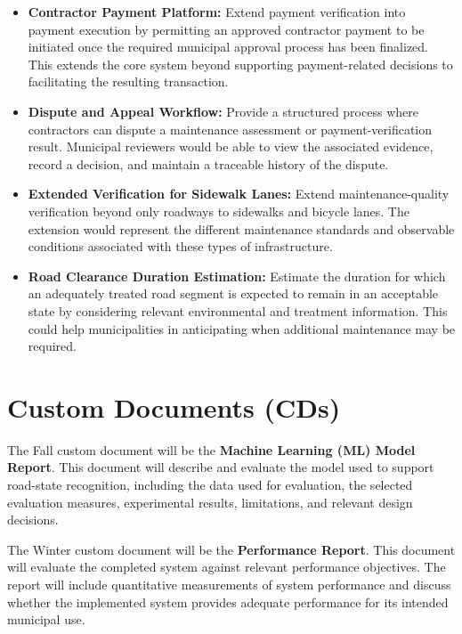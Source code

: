 \documentclass{article}
\begin{document}
\begin{itemize}

    \item \textbf{Contractor Payment Platform:}
    Extend payment verification into payment execution by permitting an approved
    contractor payment to be initiated once the required municipal approval
    process has been finalized. This extends the core system beyond supporting
    payment-related decisions to facilitating the resulting transaction.

    \item \textbf{Dispute and Appeal Workflow:}
    Provide a structured process where contractors can dispute a
    maintenance assessment or payment-verification result. Municipal reviewers
    would be able to view the associated evidence, record a decision, and
    maintain a traceable history of the dispute.

    \item \textbf{Extended Verification for Sidewalk Lanes:}
    Extend maintenance-quality verification beyond only roadways to sidewalks and
    bicycle lanes. The extension would represent the different
    maintenance standards and observable conditions associated with these types
    of infrastructure.

    \item \textbf{Road Clearance Duration Estimation:}
    Estimate the duration for which an adequately treated road segment is expected to remain
    in an acceptable state by considering relevant environmental and treatment
    information. This could help municipalities in anticipating when additional
    maintenance may be required.

\end{itemize}

\section{Custom Documents (CDs)}

The Fall custom document will be the \textbf{Machine Learning (ML) Model
Report}. This document will describe and evaluate the model used to support
road-state recognition, including the data used for evaluation, the selected
evaluation measures, experimental results, limitations, and relevant design
decisions.

The Winter custom document will be the \textbf{Performance Report}. This
document will evaluate the completed system against relevant performance
objectives. The report will include quantitative measurements of system
performance and discuss whether the implemented system provides adequate
performance for its intended municipal use.
\end{document}
